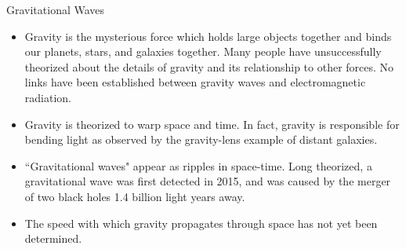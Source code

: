 {\white

{\Large Gravitational Waves}

\begin{itemize}

\item Gravity is the mysterious force which holds large objects together and binds our planets, stars, and galaxies together. Many people have unsuccessfully theorized about the details of gravity and its relationship to other forces. No links have been established between gravity waves and electromagnetic radiation.

\item Gravity is theorized to warp space and time. In fact, gravity is responsible for bending light as observed by the gravity-lens example of distant galaxies.

\item ``Gravitational waves" appear as ripples in space-time. Long theorized, a gravitational wave was first detected in 2015, and was caused by the merger of two black holes 1.4 billion light years away.

\item The speed with which gravity propagates through space has not yet been determined.

\end{itemize}
}

